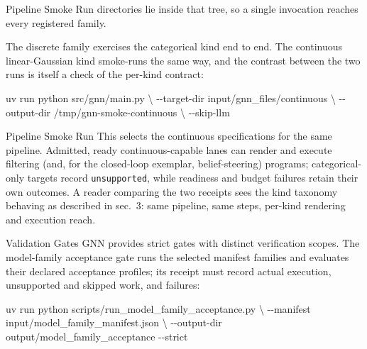 \documentclass[
  ignorenonframetext,
]{beamer}
\newenvironment{Shaded}{}{}
\newcommand{\AttributeTok}[1]{\textcolor[rgb]{0.49,0.56,0.16}{#1}}
\newcommand{\DataTypeTok}[1]{\textcolor[rgb]{0.56,0.13,0.00}{#1}}
\newcommand{\ExtensionTok}[1]{#1}
\newcommand{\NormalTok}[1]{#1}
\begin{document}
\begin{frame}{Pipeline Smoke Run}
directories lie inside that tree, so a single invocation reaches every
registered family.

The discrete family exercises the categorical kind end to end. The
continuous linear-Gaussian kind smoke-runs the same way, and the
contrast between the two runs is itself a check of the per-kind
contract:

\begin{Shaded}
\begin{Highlighting}[]
\ExtensionTok{uv}\NormalTok{ run python src/gnn/main.py }\DataTypeTok{\textbackslash{}}
  \AttributeTok{{-}{-}target{-}dir}\NormalTok{ input/gnn\_files/continuous }\DataTypeTok{\textbackslash{}}
  \AttributeTok{{-}{-}output{-}dir}\NormalTok{ /tmp/gnn{-}smoke{-}continuous }\DataTypeTok{\textbackslash{}}
  \AttributeTok{{-}{-}skip{-}llm}
\end{Highlighting}
\end{Shaded}

\end{frame}

\begin{frame}{Pipeline Smoke Run}
This selects the continuous specifications for the same pipeline.
Admitted, ready continuous-capable lanes can render and execute
filtering (and, for the closed-loop exemplar, belief-steering) programs;
categorical-only targets record \texttt{unsupported}, while readiness
and budget failures retain their own outcomes. A reader comparing the
two receipts sees the kind taxonomy behaving as described in
sec.~3: same pipeline, same steps, per-kind
rendering and execution reach.
\end{frame}

\begin{frame}{Validation Gates}
\protect{}\label{validation-gates}
GNN provides strict gates with distinct verification scopes. The
model-family acceptance gate runs the selected manifest families and
evaluates their declared acceptance profiles; its receipt must record
actual execution, unsupported and skipped work, and failures:

\begin{Shaded}
\begin{Highlighting}[]
\ExtensionTok{uv}\NormalTok{ run python scripts/run\_model\_family\_acceptance.py }\DataTypeTok{\textbackslash{}}
  \AttributeTok{{-}{-}manifest}\NormalTok{ input/model\_family\_manifest.json }\DataTypeTok{\textbackslash{}}
  \AttributeTok{{-}{-}output{-}dir}\NormalTok{ output/model\_family\_acceptance }\AttributeTok{{-}{-}strict}
\end{Highlighting}
\end{Shaded}

\end{frame}
\end{document}
